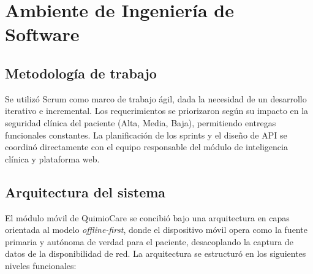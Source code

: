 \section{Ambiente de Ingeniería de Software}

\subsection*{Metodología de trabajo}

Se utilizó Scrum como marco de trabajo ágil, dada la necesidad de un desarrollo iterativo e incremental. Los requerimientos se priorizaron según su impacto en la seguridad clínica del paciente (Alta, Media, Baja), permitiendo entregas funcionales constantes. La planificación de los sprints y el diseño de API se coordinó directamente con el equipo responsable del módulo de inteligencia clínica y plataforma web.

\subsection*{Arquitectura del sistema}

El módulo móvil de QuimioCare se concibió bajo una arquitectura en capas orientada al modelo \textit{offline-first}, donde el dispositivo móvil opera como la fuente primaria y autónoma de verdad para el paciente, desacoplando la captura de datos de la disponibilidad de red. La arquitectura se estructuró en los siguientes niveles funcionales:

